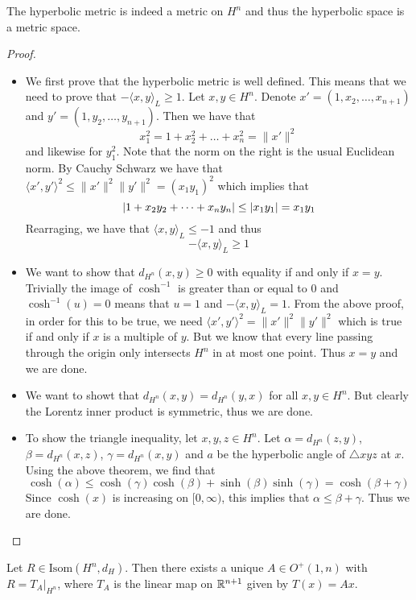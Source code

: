 \documentclass[a4paper]{article}
\begin{document}
\begin{thm}{}{} The hyperbolic metric is indeed a metric on $H^n$ and thus the hyperbolic space is a metric space. \tcbline
\begin{proof}~\\
\begin{itemize}
\item We first prove that the hyperbolic metric is well defined. This means that we need to prove that $-\langle x,y\rangle_L\geq 1$. Let $x,y\in H^n$. Denote $x'=(1,x_2,\dots,x_{n+1})$ and $y'=(1,y_2,\dots,y_{n+1})$. Then we have that $$x_1^2=1+x_2^2+\dots+x_n^2=\|x'\|^2$$ and likewise for $y_1^2$. Note that the norm on the right is the usual Euclidean norm. By Cauchy Schwarz we have that $\langle x',y'\rangle^2\leq\|x'\|^2\|y'\|^2=(x_1y_1)^2$ which implies that $$\abs{1+x_2y_2+\dots+x_ny_n}\leq\abs{x_1y_1}=x_1y_1$$ Rearraging, we have that $\langle x,y\rangle_L\leq -1$ and thus $$-\langle x,y\rangle_L\geq 1$$
\item We want to show that $d_{H^n}(x,y)\geq 0$ with equality if and only if $x=y$. Trivially the image of $\cosh^{-1}$ is greater than or equal to $0$ and $\cosh^{-1}(u)=0$ means that $u=1$ and $-\langle x,y\rangle_L=1$. From the above proof, in order for this to be true, we need $\langle x',y'\rangle^2=\|x'\|^2\|y'\|^2$ which is true if and only if $x$ is a multiple of $y$. But we know that every line passing through the origin only intersects $H^n$ in at most one point. Thus $x=y$ and we are done. 
\item We want to showt that $d_{H^n}(x,y)=d_{H^n}(y,x)$ for all $x,y\in H^n$. But clearly the Lorentz inner product is symmetric, thus we are done. 
\item To show the triangle inequality, let $x,y,z\in H^n$. Let $\alpha=d_{H^n}(z,y)$, $\beta=d_{H^n}(x,z)$, $\gamma=d_{H^n}(x,y)$ and $a$ be the hyperbolic angle of $\triangle xyz$ at $x$. Using the above theorem, we find that $$\cosh(\alpha)\leq\cosh(\gamma)\cosh(\beta)+\sinh(\beta)\sinh(\gamma)=\cosh(\beta+\gamma)$$ Since $\cosh(x)$ is increasing on $[0,\infty)$, this implies that $\alpha\leq\beta+\gamma$. Thus we are done. 
\end{itemize}
\end{proof}
\end{thm}

\begin{prp}{}{} Let $R\in\text{Isom}(H^n,d_H)$. Then there exists a unique $A\in O^+(1,n)$ with $R=T_A|_{H^n}$, where $T_A$ is the linear map on $\mathbb{R}^{n+1}$ given by $T(x)=Ax$. 
\end{prp}
\end{document}
